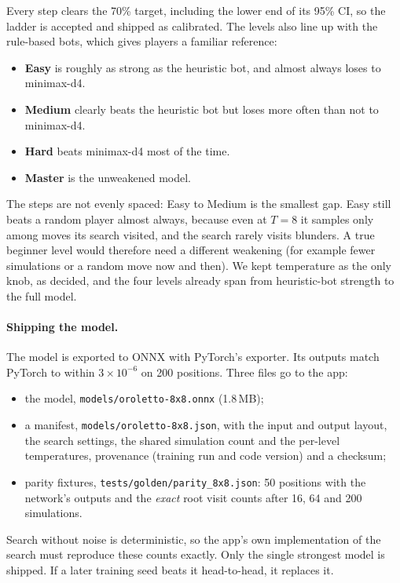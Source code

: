 \documentclass[11pt]{article}
\begin{document}
\noindent Every step clears the 70\% target, including the lower end of its
95\% CI, so the ladder is accepted and shipped as calibrated. The levels also
line up with the rule-based bots, which gives players a familiar reference:
\begin{itemize}[leftmargin=*]
  \item \textbf{Easy} is roughly as strong as the heuristic bot, and almost
        always loses to minimax-d4.
  \item \textbf{Medium} clearly beats the heuristic bot but loses more often
        than not to minimax-d4.
  \item \textbf{Hard} beats minimax-d4 most of the time.
  \item \textbf{Master} is the unweakened model.
\end{itemize}
The steps are not evenly spaced: Easy to Medium is the smallest gap. Easy still
beats a random player almost always, because even at $T=8$ it samples only
among moves its search visited, and the search rarely visits blunders. A true
beginner level would therefore need a different weakening (for example fewer
simulations or a random move now and then). We kept temperature as the only
knob, as decided, and the four levels already span from heuristic-bot strength
to the full model.

\paragraph{Shipping the model.} The model is exported to ONNX with PyTorch's
exporter. Its outputs match PyTorch to within $3\times10^{-6}$ on 200 positions.
Three files go to the app:
\begin{itemize}[leftmargin=*]
  \item the model, \texttt{models/oroletto-8x8.onnx} (1.8\,MB);
  \item a manifest, \texttt{models/oroletto-8x8.json}, with the input and output
        layout, the search settings, the shared simulation count and the
        per-level temperatures, provenance (training run and code version) and
        a checksum;
  \item parity fixtures, \texttt{tests/golden/parity\_8x8.json}: 50 positions
        with the network's outputs and the \emph{exact} root visit counts after
        16, 64 and 200 simulations.
\end{itemize}
Search without noise is deterministic, so the app's own implementation of the
search must reproduce these counts exactly. Only the single strongest model is
shipped. If a later training seed beats it head-to-head, it replaces it.
\end{document}
